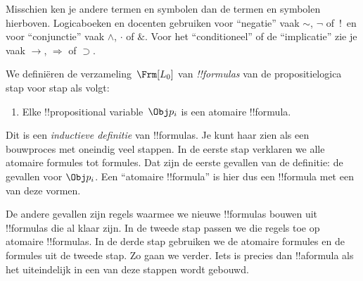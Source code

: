 \documentclass[../../../include/open-logic-section]{subfiles}
\begin{document}

\begin{intro}
Misschien ken je andere termen en symbolen dan de termen en symbolen
hierboven. Logicaboeken en docenten gebruiken voor ``negatie'' vaak
$\sim$, $\neg$ of~!\ en voor ``conjunctie'' vaak $\wedge$, $\cdot$ of
$\&$. Voor het ``conditioneel'' of de ``implicatie'' zie je vaak $\rightarrow$,
$\Rightarrow$ of $\supset$.
\end{intro}

\begin{defn}[Formule]
We definiëren de verzameling~$\Frm[L_0]$ van \emph{!!{formula}s} van
de propositielogica stap voor stap als volgt:
\begin{enumerate}


\item Elke !!{propositional variable}~$\Obj p_i$ is een atomaire
  !!{formula}.






\end{enumerate}
\end{defn}

\begin{explain}
Dit is een \emph{inductieve definitie} van !!{formula}s. Je kunt haar
zien als een bouwproces met oneindig veel stappen. In de eerste stap
verklaren we alle atomaire formules tot formules. Dat zijn de eerste
gevallen van de definitie: de gevallen voor
%
%
$\Obj p_i$. Een ``atomaire !!{formula}'' is hier dus een !!{formula}
met een van deze vormen.

De andere gevallen zijn regels waarmee we nieuwe !!{formula}s bouwen
uit !!{formula}s die al klaar zijn. In de tweede stap passen we die
regels toe op atomaire !!{formula}s. In de derde stap gebruiken we de
atomaire formules en de formules uit de tweede stap. Zo gaan we verder.
Iets is precies dan !!a{formula} als het uiteindelijk in een van deze
stappen wordt gebouwd.
\end{explain}
\end{document}
